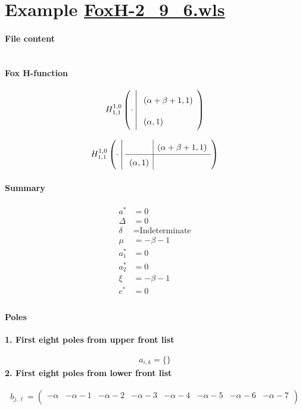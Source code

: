 \documentclass[11pt]{article}
\begin{document}
\section{Example \url{FoxH-2_9_6.wls}}

\paragraph{File content}

\inputminted{text}{FoxH-2_9_6.wls}

\paragraph{Fox H-function}

\begin{align*}
  \FoxH
    {1,0}
    {1,1}
    {\cdot}
    {\left(\alpha +\beta +1, 1\right)}
    {\left(\alpha, 1\right)}
\end{align*}

\begin{align*}
  \FoxHext
    {1,0}
    {1,1}
    {\cdot}
    {}
    {\left(\alpha +\beta +1, 1\right)}
    {\left(\alpha, 1\right)}
    {}
\end{align*}

\paragraph{Summary}

\begin{align*}
  a^*    & = 0 \\
  \Delta & = 0 \\
  \delta & = \text{Indeterminate} \\
  \mu    & = -\beta -1 \\
  a_1^*  & = 0 \\
  a_2^*  & = 0 \\
  \xi    & = -\beta -1 \\
  c^*    & = 0 \\
\end{align*}

\paragraph{Poles}

\noindent\textbf{1. First eight poles from upper front list}

\begin{align*}
  a_{i,k} = 
  \{\}
\end{align*}
\noindent\textbf{2. First eight poles from lower front list}

\begin{align*}
  b_{j,\ell} = 
  \left(
\begin{array}{cccccccc}
 -\alpha  & -\alpha -1 & -\alpha -2 & -\alpha -3 & -\alpha -4 & -\alpha -5 & -\alpha -6 & -\alpha -7 \\
\end{array}
\right)
\end{align*}

\printbibliography[title={References}]
\end{document}
